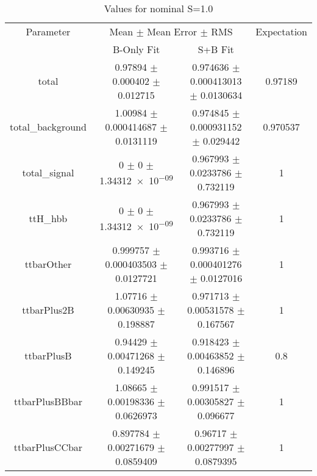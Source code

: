 \begin{table}
\centering
\caption{Values for nominal S=1.0}
\begin{tabular}{cccc}
\toprule
Parameter & \multicolumn{2}{c}{Mean $\pm$ Mean Error $\pm$ RMS} & Expectation\\
 & B-Only Fit & S+B Fit & \\
\midrule
total & \num{0.97894} $\pm$ \num{0.000402} $\pm$ \num{0.012715} & \num{0.974636} $\pm$ \num{0.000413013} $\pm$ \num{0.0130634} & \num{0.97189}\\
total\_background & \num{1.00984} $\pm$ \num{0.000414687} $\pm$ \num{0.0131119} & \num{0.974845} $\pm$ \num{0.000931152} $\pm$ \num{0.029442} & \num{0.970537}\\
total\_signal & \num{0} $\pm$ \num{0} $\pm$ \num{1.34312e-09} & \num{0.967993} $\pm$ \num{0.0233786} $\pm$ \num{0.732119} & \num{1}\\
ttH\_hbb & \num{0} $\pm$ \num{0} $\pm$ \num{1.34312e-09} & \num{0.967993} $\pm$ \num{0.0233786} $\pm$ \num{0.732119} & \num{1}\\
ttbarOther & \num{0.999757} $\pm$ \num{0.000403503} $\pm$ \num{0.0127721} & \num{0.993716} $\pm$ \num{0.000401276} $\pm$ \num{0.0127016} & \num{1}\\
ttbarPlus2B & \num{1.07716} $\pm$ \num{0.00630935} $\pm$ \num{0.198887} & \num{0.971713} $\pm$ \num{0.00531578} $\pm$ \num{0.167567} & \num{1}\\
ttbarPlusB & \num{0.94429} $\pm$ \num{0.00471268} $\pm$ \num{0.149245} & \num{0.918423} $\pm$ \num{0.00463852} $\pm$ \num{0.146896} & \num{0.8}\\
ttbarPlusBBbar & \num{1.08665} $\pm$ \num{0.00198336} $\pm$ \num{0.0626973} & \num{0.991517} $\pm$ \num{0.00305827} $\pm$ \num{0.096677} & \num{1}\\
ttbarPlusCCbar & \num{0.897784} $\pm$ \num{0.00271679} $\pm$ \num{0.0859409} & \num{0.96717} $\pm$ \num{0.00277997} $\pm$ \num{0.0879395} & \num{1}\\
\bottomrule
\end{tabular}
\end{table}